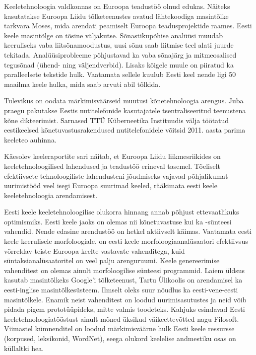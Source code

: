 \begin{multicols}{2}
Keeletehnoloogia valdkonnas on Euroopa teadustöö olnud edukas. 
Näiteks kasutatakse Euroopa Liidu tõlketeenustes avatud lähtekoodiga masintõlke tarkvara Moses, mida arendati peamiselt Euroopa teadusprojektide raames. 
Eesti keele masintõlge on tõsine väljakutse. 
Sõnastikupõhise analüüsi muudab keeruliseks vaba liitsõnamoodustus, uusi sõnu saab liitmise teel alati juurde tekitada. 
Analüüsiprobleeme põhjustavad ka vaba sõnajärg ja mitmeosalised tegusõnad (ühend- ning väljendverbid). 
Lisaks kõigele muule on piiratud ka paralleelsete tekstide hulk. 
Vaatamata sellele kuulub Eesti keel nende ligi 50 maailma keele hulka, mida saab arvuti abil tõlkida.

Tulevikus on oodata märkimisväärseid muutusi kõnetehnoloogia arengus.
Juba praegu pakutakse Eestis nutitelefonide kasutajatele tsentraliseeritud teenustena kõne dikteerimist.
Sarnased TTÜ Küberneetika Instituudis välja töötatud eestikeelsed kõnetuvastusrakendused nutitelefonidele võitsid 2011. aasta parima keeleteo auhinna.

Käesolev keeleraportite sari näitab, et Euroopa Liidu liikmesriikides on keeletehno\-loogilised lahendused ja teadustöö erineval tasemel. 
Tõeliselt efektiivsete tehnoloogiliste lahendusteni jõudmiseks vajavad põhjalikumat uurimistööd veel isegi Euroopa suurimad keeled, rääkimata eesti keele keeletehnoloogia arendamisest. 

Eesti keele keeletehnoloogilise olukorra hinnang annab põhjust ettevaatlikuks optimismiks.  Eesti keele jaoks on olemas nii kõnetuvastuse kui ka -sünteesi vahendid. Nende edasine arendustöö on hetkel aktiivselt käimas.  Vaatamata eesti keele keerulisele morfoloogiale, on eesti keele morfoloogiaanalüsaatori efektiivsus võrreldav teiste Euroopa keelte vastavate vahenditega, kuid süntaksianalüsaatoritel on veel palju arenguruumi.  Keele genereerimise vahenditest on olemas ainult morfoloogilise sünteesi programmid.  Laiem üldsus kasutab masintõlkeks Google'i tõlketeenust, Tartu Ülikoolis on arendamisel ka eesti-inglise masintõlkesüsteem. Ilmselt oleks suur nõudlus ka eesti-vene-eesti masintõlkele.  Enamik neist vahenditest on loodud uurimisasutustes ja neid võib pidada pigem prototüüpideks, mitte valmis toodeteks. Kahjuks esindavad Eesti keeletehnoloogiatööstust ainult mõned üksikud väikeettevõtted nagu Filosoft.  Viimastel kümnenditel on loodud märkimisväärne hulk Eesti keele ressursse (korpused, leksikonid, WordNet), seega olukord keelelise andmestiku osas on küllaltki hea.


\end{multicols}
